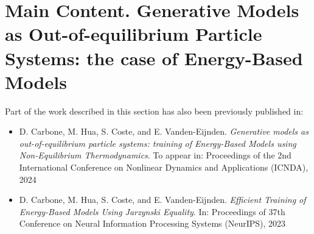 \documentclass[b5paper, 10 pt, twoside]{book}
\numberwithin{equation}{section}
\theoremstyle{plain}
\theoremstyle{definition}
\theoremstyle{definition}
\theoremstyle{remark}
\begin{document}
\newcommand{\R}{\mathbb{R}}
\newcommand{\E}{\mathbb{E}}
\newcommand{\PP}{\mathbb{P}}
\newcommand{\N}{\mathbb{N}}
\newcommand{\Z}{\mathbb{Z}}
\newcommand{\T}{\mathsf{T}}



\clearpage{\pagestyle{empty}\cleardoublepage}



\part{Main Content. Generative Models as Out-of-equilibrium Particle Systems: the case of Energy-Based Models}
\label{blx:refsection\therefsection}
Part of the work described in this section has also been previously published in:
\begin{itemize}
\item D. Carbone, M. Hua, S. Coste, and E. Vanden-Eijnden. \emph{Generative models as out-of-equilibrium particle systems: training of Energy-Based Models using Non-Equilibrium Thermodynamics}. To appear in: Proceedings of the 2nd International Conference on Nonlinear Dynamics and Applications (ICNDA), 2024
\item D. Carbone, M. Hua, S. Coste, and E. Vanden-Eijnden. \emph{Efficient Training of Energy-Based Models
Using Jarzynski Equality}. In: Proceedings of 37th Conference on Neural Information Processing Systems (NeurIPS), 2023
\end{itemize}



%







\printbibheading
\bibbysection[heading=bibbysubsect]

	
\end{document}
